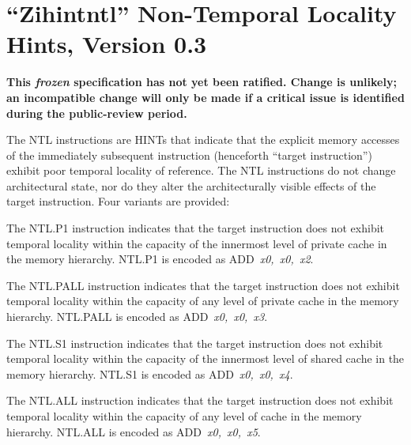 \chapter{``Zihintntl'' Non-Temporal Locality Hints, Version 0.3}
\label{chap:zihintntl}

{\bf This {\em frozen} specification has not yet been ratified.  Change is
unlikely; an incompatible change will only be made if a critical issue is
identified during the public-review period.}

The NTL instructions are HINTs that indicate that the explicit memory accesses of the immediately subsequent
instruction (henceforth ``target instruction'') exhibit poor temporal locality of reference.
The NTL instructions do not change architectural state, nor do they alter the
architecturally visible effects of the target instruction.
Four variants are provided:

The NTL.P1 instruction indicates that the target instruction
does not exhibit temporal locality within the capacity of the innermost level
of private cache in the memory hierarchy.
NTL.P1 is encoded as \mbox{ADD {\em x0, x0, x2}}.

The NTL.PALL instruction indicates that the target instruction
does not exhibit temporal locality within the capacity of any
level of private cache in the memory hierarchy.
NTL.PALL is encoded as \mbox{ADD {\em x0, x0, x3}}.

The NTL.S1 instruction indicates that the target instruction
does not exhibit temporal locality within the capacity of the innermost level
of shared cache in the memory hierarchy.
NTL.S1 is encoded as \mbox{ADD {\em x0, x0, x4}}.

The NTL.ALL instruction indicates that the target
instruction does not exhibit temporal locality within the capacity of any
level of cache in the memory hierarchy.
NTL.ALL is encoded as \mbox{ADD {\em x0, x0, x5}}.

